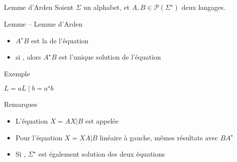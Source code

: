 
\begingroup

\begin{frame}{Lemme d'Arden}
  Soient $\Sigma$ un alphabet, et $A, B \in \mathscr{P}(\Sigma^\star)$ deux langages.
  \begin{block}{Lemme -- Lemme d'Arden}
    \begin{itemize}
    \item \alert{$A^\star B$} est la  de l'équation 
    \item si , alors \alert{$A^\star B$} est l'\alert{unique} solution de l'équation 
    \end{itemize}
  \end{block}
  \begin{exampleblock}{Exemple}
    \noindent\begin{minipage}{.4\textwidth}
    \end{minipage}%
    \begin{minipage}{.6\textwidth}
      $ L = a L \mid b = a^\star b$
    \end{minipage}
  \end{exampleblock}
  \begin{block}{Remarques}
    \begin{itemize}
    \item {\small L'équation $X = AX | B$ est appelée }
    \item {\small Pour l'équation $X = XA | B$ linéaire à gauche, mêmes résultats avec $B A^\star$}
    \item {\small Si , $\Sigma^\star$ est également solution des deux équations}
    \end{itemize}
  \end{block}
\end{frame}

\endgroup
